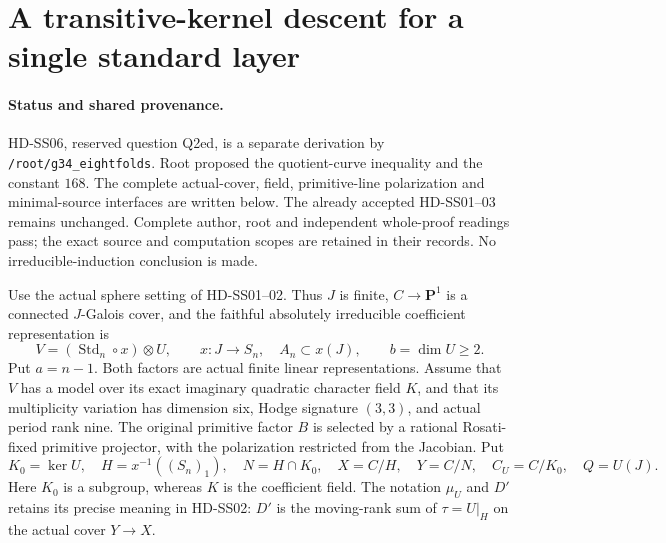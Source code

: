 \section{A transitive-kernel descent for a single standard layer}
\label{sec:standard-kernel-descent}

\paragraph{Status and shared provenance.}
HD-SS06, reserved question Q2ed, is a separate derivation by
\texttt{/root/g34\_eightfolds}. Root proposed the quotient-curve
inequality and the constant \(168\). The complete actual-cover,
field, primitive-line polarization and minimal-source interfaces
are written below. The already accepted HD-SS01--03 remains
unchanged. Complete author, root and independent whole-proof readings pass; the exact source and computation scopes are retained in their records.
No irreducible-induction conclusion is made.

Use the actual sphere setting of HD-SS01--02. Thus \(J\) is finite,
\(C\longrightarrow\mathbf P^1\) is a connected \(J\)-Galois cover,
and the faithful absolutely irreducible coefficient representation is
\[
 V=(\operatorname{Std}_n\circ x)\otimes U,\qquad
 x:J\longrightarrow S_n,\quad A_n\subset x(J),\qquad
 b=\dim U\ge2.
 \tag{SSK.1}
\]
Put \(a=n-1\). Both factors are actual finite linear representations. Assume that
\(V\) has a model over its exact imaginary quadratic character field
\(K\), and that its multiplicity variation has dimension six, Hodge
signature \((3,3)\), and actual period rank nine. The original primitive
factor \(B\) is selected by a rational Rosati-fixed primitive projector,
with the polarization restricted from the Jacobian. Put
\[
 K_0=\ker U,\quad H=x^{-1}((S_n)_1),\quad N=H\cap K_0,\quad
 X=C/H,\quad Y=C/N,\quad C_U=C/K_0,\quad Q=U(J).
 \tag{SSK.2}
\]
Here \(K_0\) is a subgroup, whereas \(K\) is the coefficient field.
The notation \(\mu_U\) and \(D'\) retains its precise meaning in
HD-SS02: \(D'\) is the moving-rank sum of
\(\tau=U|_H\) on the actual cover \(Y\longrightarrow X\).

